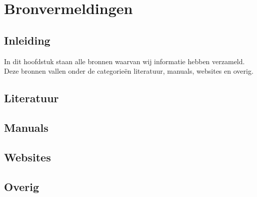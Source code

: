 \chapter{Bronvermeldingen}
\section{Inleiding}
In dit hoofdstuk staan alle bronnen waarvan wij informatie hebben verzameld.
Deze bronnen vallen onder de categorieën literatuur, manuals, websites en overig.

\section{Literatuur}

\section{Manuals}

\section{Websites}

\section{Overig}

